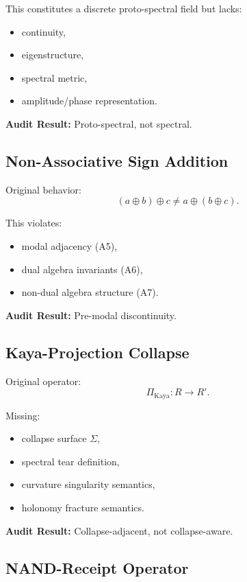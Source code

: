 \documentclass[11pt]{article}
\begin{document}
This constitutes a discrete proto-spectral field but lacks:
\begin{itemize}
  \item continuity,
  \item eigenstructure,
  \item spectral metric,
  \item amplitude/phase representation.
\end{itemize}

\textbf{Audit Result:} Proto-spectral, not spectral.

\subsection{Non-Associative Sign Addition}

Original behavior:
\[
(a \oplus b) \oplus c \neq a \oplus (b \oplus c).
\]

This violates:
\begin{itemize}
  \item modal adjacency (A5),
  \item dual algebra invariants (A6),
  \item non-dual algebra structure (A7).
\end{itemize}

\textbf{Audit Result:} Pre-modal discontinuity.

\subsection{Kaya-Projection Collapse}

Original operator:
\[
\Pi_{\mathrm{Kaya}} : R \to R'.
\]

Missing:
\begin{itemize}
  \item collapse surface $\Sigma$,
  \item spectral tear definition,
  \item curvature singularity semantics,
  \item holonomy fracture semantics.
\end{itemize}

\textbf{Audit Result:} Collapse-adjacent, not collapse-aware.

\subsection{NAND-Receipt Operator}
\end{document}
